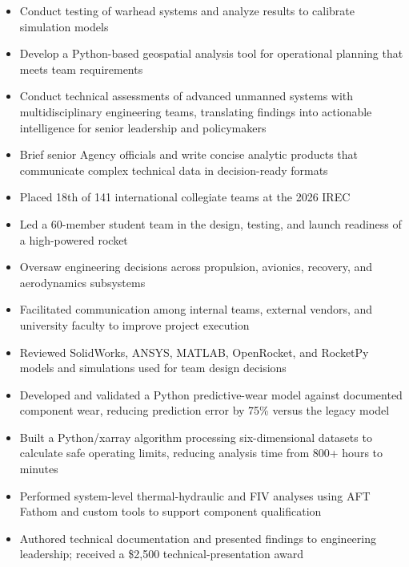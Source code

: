 \documentclass[10pt,letterpaper]{article}
\begin{document}
\resumeHeader
{}


\begin{itemize}
  \item Conduct testing of warhead systems and analyze results to calibrate simulation models
  \item Develop a Python-based geospatial analysis tool for operational planning that meets team requirements
  \item Conduct technical assessments of advanced unmanned systems with multidisciplinary engineering teams, translating findings into actionable intelligence for senior leadership and policymakers
  \item Brief senior Agency officials and write concise analytic products that communicate complex technical data in decision-ready formats
\end{itemize}

\vspace{2pt}
\earlierRoles
\begin{itemize}
  \item Placed 18th of 141 international collegiate teams at the 2026 IREC
  \item Led a 60-member student team in the design, testing, and launch readiness of a high-powered rocket
  \item Oversaw engineering decisions across propulsion, avionics, recovery, and aerodynamics subsystems
  \item Facilitated communication among internal teams, external vendors, and university faculty to improve project execution
  \item Reviewed SolidWorks, ANSYS, MATLAB, OpenRocket, and RocketPy models and simulations used for team design decisions
\end{itemize}

\vspace{2pt}
\begin{itemize}
  \item Developed and validated a Python predictive-wear model against documented component wear, reducing prediction error by 75\% versus the legacy model
  \item Built a Python/xarray algorithm processing six-dimensional datasets to calculate safe operating limits, reducing analysis time from 800+ hours to minutes
  \item Performed system-level thermal-hydraulic and FIV analyses using AFT Fathom and custom tools to support component qualification
  \item Authored technical documentation and presented findings to engineering leadership; received a \$2,500 technical-presentation award
\end{itemize}
\end{document}
